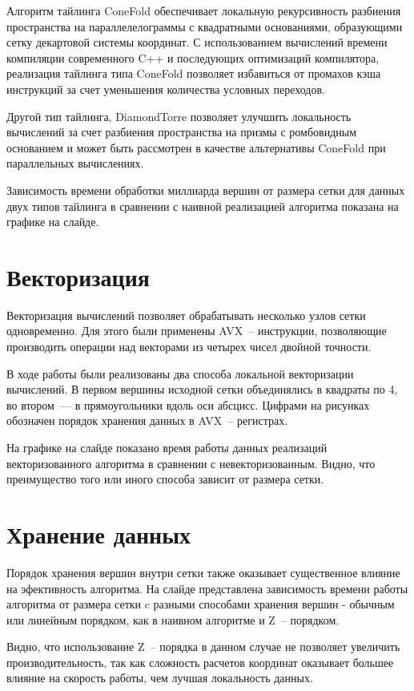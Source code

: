 \documentclass[18pt]{article}
\begin{document}
Алгоритм тайлинга ConeFold обеспечивает локальную рекурсивность разбиения
пространства на параллелелограммы с квадратными основаниями, образующими сетку
декартовой системы координат. 
С использованием вычислений времени компиляции современного C++ и 
последующих оптимизаций компилятора, реализация тайлинга типа ConeFold 
позволяет избавиться от промахов кэша инструкций за счет уменьшения количества
условных переходов.

Другой тип тайлинга, DiamondTorre позволяет улучшить локальность вычислений 
за счет разбиения пространства на призмы с ромбовидным основанием и может 
быть рассмотрен в качестве альтернативы ConeFold при параллельных вычислениях.

Зависимость времени обработки миллиарда вершин от размера сетки 
для данных двух типов тайлинга в сравнении с наивной реализацией алгоритма 
показана на графике на слайде.

\section{Векторизация}
\par
Векторизация вычислений позволяет обрабатывать несколько узлов сетки 
одновременно. Для этого были применены AVX~-- инструкции, позволяющие 
производить операции над векторами из четырех чисел двойной точности.

В ходе работы были реализованы два способа локальной векторизации вычислений.
В первом вершины исходной сетки объединялись в квадраты по 4, 
во втором~--- в прямоугольники вдоль оси абсцисс.
Цифрами на рисунках обозначен порядок хранения данных в AVX~-- регистрах.

На графике на слайде показано время работы данных реализаций векторизованного 
алгоритма в сравнении с невекторизованным. Видно, что преимущество того 
или иного способа зависит от размера сетки.

\section{Хранение данных}
\par
Порядок хранения вершин внутри сетки также оказывает существенное влияние на 
эфективность алгоритма. На слайде представлена зависимость времени 
работы алгоритма от размера сетки c разными способами хранения вершин - 
обычным или линейным порядком, как в наивном алгоритме и Z~-- порядком.

Видно, что использование Z~-- порядка в данном случае не позволяет увеличить
производительность, так как сложность расчетов координат оказывает 
большее влияние на скорость работы, чем лучшая локальность данных.
\end{document}
